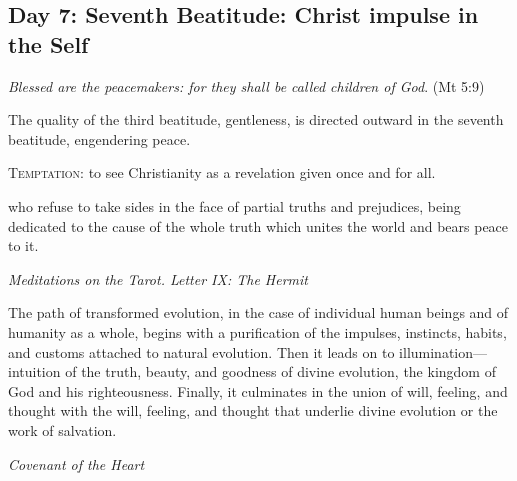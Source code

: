 \subsection*{Day 7: Seventh Beatitude: Christ impulse in the Self}
\emph{Blessed are the peacemakers: for they shall be called children of God}. (Mt 5:9)

The quality of the third beatitude, gentleness, is directed outward in the seventh beatitude, engendering peace.

\textsc{Temptation}: to see Christianity as a revelation given once and for all.

\begin{quotationx}
 who refuse to take sides in the face of partial truths and prejudices, being dedicated to
the cause of the whole truth which unites the world and bears peace to it.
\begin{flushright}\textit{Meditations on the Tarot. Letter
IX: The Hermit}\end{flushright}

The path of transformed evolution, in the case of individual human beings and of humanity as a whole, begins with a
purification of the impulses, instincts, habits, and customs attached to natural evolution. Then it leads on to
illumination—intuition of the truth, beauty, and goodness of divine evolution, the kingdom of God
and his righteousness. Finally, it culminates in the union of will, feeling, and thought with the will, feeling, and
thought that underlie divine evolution or the work of salvation. 
\begin{flushright}\textit{Covenant of the Heart}\end{flushright}

\end{quotationx}

